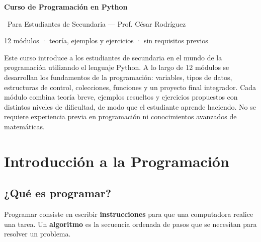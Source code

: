 \documentclass[11pt,a4paper]{article}
\newcommand{\bandaTitulo}[2]{%
  \begin{tcolorbox}[
    enhanced,
    colback=verdeTurquesa, colframe=verdeTurquesa,
    boxrule=0pt, arc=8pt, outer arc=8pt,
    width=\linewidth,
    top=18pt, bottom=6pt, left=14pt, right=14pt,
    borderline south={3.5pt}{0pt}{cyanNeon},
  ]
    \begin{minipage}[c]{0.07\linewidth}
      \centering
      \textcolor{cyanNeon}{\fontsize{30}{30}\selectfont\faIcon{python}}
    \end{minipage}%
    \hspace{8pt}%
    \begin{minipage}[c]{0.88\linewidth}
      {\fontsize{20}{24}\selectfont\bfseries\color{white}#1}\par\vspace{5pt}%
      \textcolor{cyanNeon!80!white}{\small\faIcon{angle-right}~#2}%
    \end{minipage}
    \vspace{4pt}
  \end{tcolorbox}%
  \vspace{8pt}%
}
\begin{document}
\bandaTitulo{Curso de Programación en Python}{Para Estudiantes de Secundaria --- Prof. César Rodríguez}

\begin{center}
  \vspace{2pt}
  {\large\color{grisTexto} 12 módulos · teoría, ejemplos y ejercicios · sin requisitos previos}
  \vspace{4pt}
\end{center}

\begin{tcolorbox}[
  enhanced, breakable,
  arc=6pt, outer arc=6pt,
  colback=grisPapel, colframe=grisLinea, boxrule=0.8pt,
  left=12pt, right=12pt, top=8pt, bottom=8pt,
]
\noindent Este curso introduce a los estudiantes de secundaria en el mundo de la programación utilizando el lenguaje Python. A lo largo de 12 módulos se desarrollan los fundamentos de la programación: variables, tipos de datos, estructuras de control, colecciones, funciones y un proyecto final integrador. Cada módulo combina teoría breve, ejemplos resueltos y ejercicios propuestos con distintos niveles de dificultad, de modo que el estudiante aprende haciendo. No se requiere experiencia previa en programación ni conocimientos avanzados de matemáticas.
\end{tcolorbox}

\vspace{6pt}
\tableofcontents
\newpage

\section{Introducción a la Programación}

\subsection{¿Qué es programar?}

Programar consiste en escribir \textbf{instrucciones} para que una computadora realice una tarea. Un \textbf{algoritmo} es la secuencia ordenada de pasos que se necesitan para resolver un problema.
\end{document}
